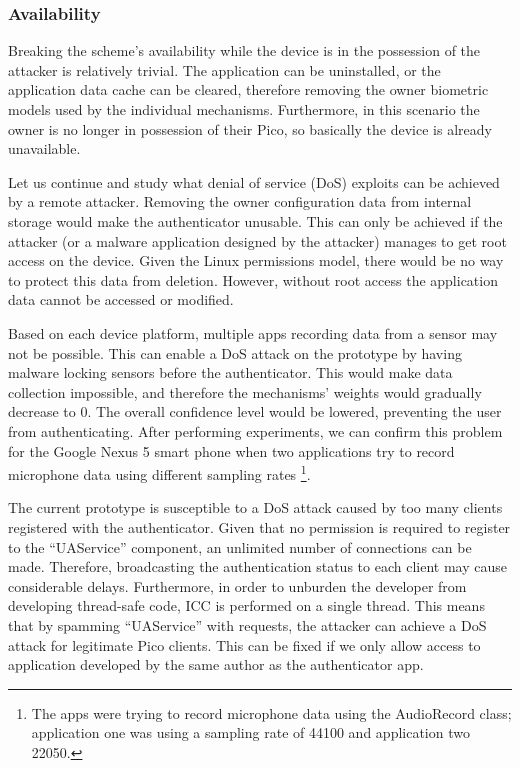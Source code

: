 \subsubsection*{Availability}
Breaking the scheme's availability while the device is in the possession of the attacker is relatively trivial. The application can be uninstalled, or the application data cache can be cleared, therefore removing the owner biometric models used by the individual mechanisms. Furthermore, in this scenario the owner is no longer in possession of their Pico, so basically the device is already unavailable.

Let us continue and study what denial of service (DoS) exploits can be achieved by a remote attacker. Removing the owner configuration data from internal storage would make the authenticator unusable. This can only be achieved if the attacker (or a malware application designed by the attacker) manages to get root access on the device. Given the Linux permissions model, there would be no way to protect this data from deletion. However, without root access the application data cannot be accessed or modified.

Based on each device platform, multiple apps recording data from a sensor may not be possible. This can enable a DoS attack on the prototype by having malware locking sensors before the authenticator. This would make data collection impossible, and therefore the mechanisms' weights would gradually decrease to 0. The overall confidence level would be lowered, preventing the user from authenticating. After performing experiments, we can confirm this problem for the Google Nexus 5 smart phone when two applications try to record microphone data using different sampling rates \footnote{The apps were trying to record microphone data using the AudioRecord class; application one was using a sampling rate of 44100 and application two 22050.}.

The current prototype is susceptible to a DoS attack caused by too many clients registered with the authenticator. Given that no permission is required to register to the ``UAService'' component, an unlimited number of connections can be made. Therefore, broadcasting the authentication status to each client may cause considerable delays. Furthermore, in order to unburden the developer from developing thread-safe code, ICC is performed on a single thread. This means that by spamming ``UAService'' with requests, the attacker can achieve a DoS attack for legitimate Pico clients. This can be fixed if we only allow access to application developed by the same author as the authenticator app.

